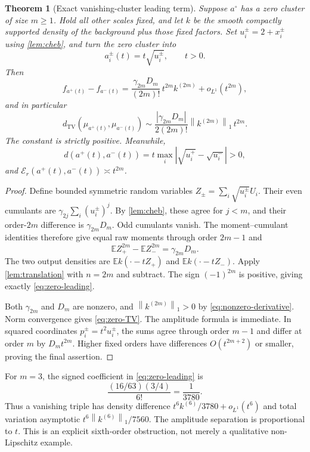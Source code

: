 \documentclass[11pt,a4paper]{article}
\numberwithin{equation}{section}
\newtheorem{theorem}{Theorem}[section]
\theoremstyle{definition}
\theoremstyle{remark}
\newcommand{\E}{\mathbb E}
\newcommand{\TV}{d_{\mathrm{TV}}}
\newcommand{\norm}[1]{\left\lVert#1\right\rVert}
\newcommand{\err}{\mathcal E_r}
\newcommand{\base}{a^{\circ}}
\begin{document}
\begin{theorem}[Exact vanishing-cluster leading term]
\label{thm:zero-leading}
Suppose $\base$ has a zero cluster of size $m\ge1$.  Hold all other scales fixed,
and let $k$ be the smooth compactly supported density of the background plus
those fixed factors.  Set $u_i^\pm=2+x_i^\pm$ using \cref{lem:cheb}, and turn the
zero cluster into
\begin{equation}
 a_i^\pm(t)=t\sqrt{u_i^\pm},\qquad t>0.
 \label{eq:zero-paths}
\end{equation}
Then
\begin{equation}
 f_{a^+(t)}-f_{a^-(t)}
 =\frac{\gamma_{2m}D_m}{(2m)!}\,t^{2m}k^{(2m)}
   +o_{L^1}(t^{2m}),
 \label{eq:zero-leading}
\end{equation}
and in particular
\begin{equation}
 \TV(\mu_{a^+(t)},\mu_{a^-(t)})
 \sim\frac{|\gamma_{2m}D_m|}{2(2m)!}
       \norm{k^{(2m)}}_1\,t^{2m}.
 \label{eq:zero-TV}
\end{equation}
The constant is strictly positive.  Meanwhile,
\begin{equation}
 d(a^+(t),a^-(t))
 =t\max_i|\sqrt{u_i^+}-\sqrt{u_i^-}|>0,
 \label{eq:zero-distance}
\end{equation}
and $\err(a^+(t),a^-(t))\asymp t^{2m}$.
\end{theorem}
\begin{proof}
Define bounded symmetric random variables
$Z_\pm=\sum_i\sqrt{u_i^\pm}U_i$.  Their even cumulants are
$\gamma_{2j}\sum_i(u_i^\pm)^j$.  By \cref{lem:cheb}, these agree for $j<m$,
and their order-$2m$ difference is $\gamma_{2m}D_m$.  Odd cumulants vanish.
The moment--cumulant identities therefore give equal raw moments through order
$2m-1$ and
\[
 \E Z_+^{2m}-\E Z_-^{2m}=\gamma_{2m}D_m.
\]
The two output densities are $\E k(\cdot-tZ_+)$ and $\E k(\cdot-tZ_-)$.
Apply \cref{lem:translation} with $n=2m$ and subtract.  The sign $(-1)^{2m}$ is
positive, giving exactly \eqref{eq:zero-leading}.

Both $\gamma_{2m}$ and $D_m$ are nonzero, and
$\norm{k^{(2m)}}_1>0$ by \eqref{eq:nonzero-derivative}.  Norm convergence gives
\eqref{eq:zero-TV}.  The amplitude formula is immediate.  In squared coordinates
$p_i^\pm=t^2u_i^\pm$, the sums agree through order $m-1$ and differ at order
$m$ by $D_mt^{2m}$.  Higher fixed orders have differences $O(t^{2m+2})$ or
smaller, proving the final assertion.
\end{proof}

For $m=3$, the signed coefficient in \eqref{eq:zero-leading} is
\[
 \frac{(16/63)(3/4)}{6!}=\frac1{3780}.
\]
Thus a vanishing triple has density difference
$t^6k^{(6)}/3780+o_{L^1}(t^6)$ and total variation asymptotic
$t^6\norm{k^{(6)}}_1/7560$.  The amplitude separation is proportional to $t$.
This is an explicit sixth-order obstruction, not merely a qualitative
non-Lipschitz example.
\end{document}
